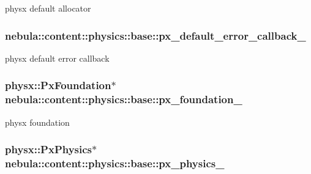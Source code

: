 physx default allocator \hypertarget{classnebula_1_1content_1_1physics_1_1base_acbed0d466473d89c816bfb86d5ee54c1}{
\subsubsection[{px\_\-default\_\-error\_\-callback\_\-}]{ {\bf nebula::content::physics::base::px\_\-default\_\-error\_\-callback\_\-}}}
\label{classnebula_1_1content_1_1physics_1_1base_acbed0d466473d89c816bfb86d5ee54c1}


physx default error callback \hypertarget{classnebula_1_1content_1_1physics_1_1base_a63675a6e212b91289f28cbf29675bf30}{
\subsubsection[{px\_\-foundation\_\-}]{\setlength{\rightskip}{0pt plus 5cm}physx::PxFoundation$\ast$ {\bf nebula::content::physics::base::px\_\-foundation\_\-}}}
\label{classnebula_1_1content_1_1physics_1_1base_a63675a6e212b91289f28cbf29675bf30}


physx foundation \hypertarget{classnebula_1_1content_1_1physics_1_1base_a0f5bbd5c17cdb78f856b30ef2e423848}{
\subsubsection[{px\_\-physics\_\-}]{\setlength{\rightskip}{0pt plus 5cm}physx::PxPhysics$\ast$ {\bf nebula::content::physics::base::px\_\-physics\_\-}}}
\label{classnebula_1_1content_1_1physics_1_1base_a0f5bbd5c17cdb78f856b30ef2e423848}


